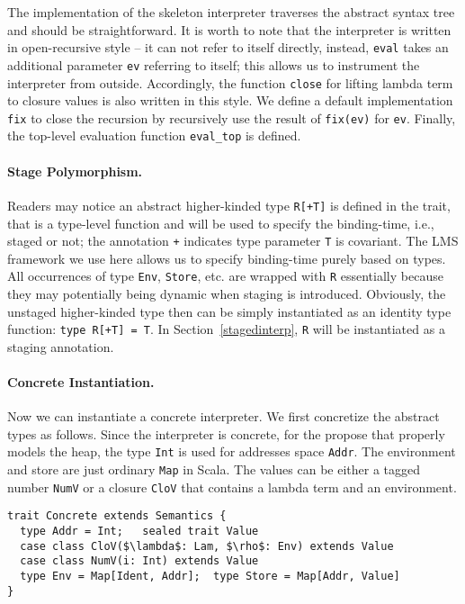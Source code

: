 The implementation of the skeleton interpreter traverses the abstract syntax tree and should be straightforward.
It is worth to note that the interpreter is written in open-recursive style -- 
it can not refer to itself directly, instead, \texttt{eval} takes an additional 
parameter \texttt{ev} referring to itself; this allows us to instrument the interpreter
from outside. Accordingly, the function \texttt{close} for lifting lambda term to closure values
is also written in this style.
We define a default implementation \texttt{fix} to close the recursion by recursively use the result 
of \texttt{fix(ev)} for \texttt{ev}. 
Finally, the top-level evaluation function \texttt{eval\_top} is defined.

\paragraph{Stage Polymorphism.}
Readers may notice an abstract higher-kinded type \texttt{R[+T]} is defined in the trait, that is a
type-level function and will be used to specify the binding-time, i.e., staged or not; the annotation 
\texttt{+} indicates type parameter \texttt{T} is covariant.
The LMS framework we use here allows us to specify binding-time purely based on types.
All occurrences of type \texttt{Env}, \texttt{Store}, etc. are wrapped with \texttt{R} 
essentially because they may potentially being dynamic when staging is introduced.
Obviously, the unstaged higher-kinded type then can be simply instantiated as an identity type function: 
\texttt{type R[+T] = T}. In Section~\ref{stagedinterp}, \texttt{R} will be instantiated 
as a staging annotation. 

\paragraph{Concrete Instantiation.}
Now we can instantiate a concrete interpreter. We first concretize the abstract types as follows.
Since the interpreter is concrete, for the propose that properly models the heap, the type \texttt{Int} 
is used for addresses space \texttt{Addr}. The environment and store are just ordinary \texttt{Map} in Scala.
The values can be either a tagged number \texttt{NumV} or a closure \texttt{CloV} that contains a lambda term
and an environment.

\begin{lstlisting}
trait Concrete extends Semantics {
  type Addr = Int;   sealed trait Value
  case class CloV($\lambda$: Lam, $\rho$: Env) extends Value
  case class NumV(i: Int) extends Value
  type Env = Map[Ident, Addr];  type Store = Map[Addr, Value]
}
\end{lstlisting}

